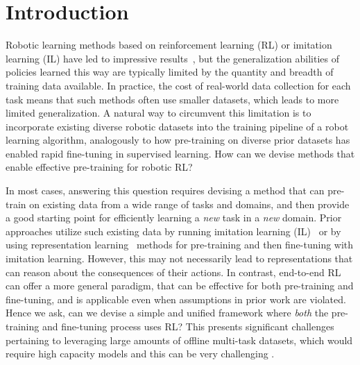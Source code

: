 \vspace{0.1cm}
\section{Introduction}
\label{sec:intro}
\vspace{0.1cm}

Robotic learning methods based on reinforcement learning (RL) or imitation learning (IL) have led to impressive results~\citep{levine2016end,kalashnikov2018qtopt, young2020visual, kalashnikov2021mt,ahn2022can}, but the generalization abilities of policies learned this way are typically limited by the quantity and breadth of training data available. In practice, the cost of real-world data collection for each task means that such methods often use smaller datasets, which leads to more limited generalization. A natural way to circumvent this limitation is to incorporate existing diverse robotic datasets into the training pipeline of a robot learning algorithm, analogously to how pre-training on diverse prior datasets has enabled rapid fine-tuning in supervised learning. How can we devise methods that enable effective pre-training for robotic RL?

In most cases, answering this question requires devising a method that can pre-train on existing data from a wide range of tasks and domains, and then provide a good starting point for efficiently learning a \emph{new} task in a \emph{new} domain. Prior approaches utilize such existing data by running imitation learning (IL)~\citep{young2020visual,ebert2021bridge,shafiullah2022behavior} or by using representation learning~\citep{nair2022r3m} methods for pre-training and then fine-tuning with imitation learning. However, this may not necessarily lead to representations that can reason about the consequences of their actions. In contrast, end-to-end RL can offer a more general paradigm, that can be effective for both pre-training and fine-tuning, and is applicable even when assumptions in prior work are violated. Hence we ask, can we devise a simple and unified framework where \emph{both} the pre-training and fine-tuning process uses RL? This presents significant challenges pertaining to leveraging large amounts of offline multi-task datasets, which would require high capacity models and this can be very challenging \citep{bjorck2021towards}.

